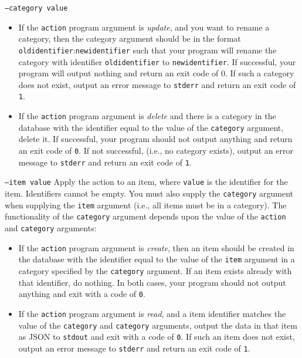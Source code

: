 \documentclass[a4paper]{article}
\begin{document}
\begin{labeling}{ \texttt{--category value} }
\begin{itemize}
        \item If the \texttt{action} program argument is \emph{update}, and you want to rename a category, then the category argument should be in the format \\\texttt{oldidentifier}:\texttt{newidentifier} such that your program will rename the category with identifier \texttt{oldidentifier} to \texttt{newidentifier}. If successful, your program will output nothing and return an exit code of 0. If such a category does not exist, output an error message to \texttt{stderr} and return an exit code of \texttt{1}.
    
        \item If the \texttt{action} program argument is \emph{delete} and there is a category in the database with the identifier equal to the value of the \texttt{category} argument, delete it. If successful, your program should not output anything and return an exit code of \texttt{0}. If not successful, (i.e., no category exists), output an error message to \texttt{stderr} and return an exit code of \texttt{1}.
        \end{itemize}
    
    \item[\texttt{--item value}]
    Apply the action to an item, where \texttt{value} is the identifier for the item. Identifiers cannot be empty. You must also supply the \texttt{category} argument when supplying the \texttt{item} argument (i.e., all items must be in a category). The functionality of the \texttt{category} argument depends upon the value of the \texttt{action} and \texttt{category} arguments:
        \begin{itemize}
    
        \item If the \texttt{action} program argument is \emph{create}, then an item should be created in the database with the identifier equal to the value of the \texttt{item} argument in a category specified by the \texttt{category} argument. If an item exists already with that identifier, do nothing. In both cases, your program should not output anything and exit with a code of \texttt{0}.
    
        \item If the \texttt{action} program argument is \emph{read}, and a item identifier matches the value of the \texttt{category} and \texttt{category} arguments, output the data in that item as JSON to \texttt{stdout} and exit with a code of \texttt{0}. If such an item does not exist, output an error message to \texttt{stderr} and return an exit code of \texttt{1}.
    

\end{itemize}
\end{labeling}
\end{document}
